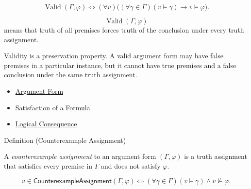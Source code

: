 \begin{remark*}
\[
\operatorname{Valid}(\Gamma,\varphi)
\Longleftrightarrow
(\forall v)\bigl((\forall\gamma\in\Gamma)(v\models\gamma)
\to v\models\varphi\bigr).
\]
\end{remark*}

\begin{remark*}
\[
  \operatorname{Valid}(\Gamma,\varphi)
\] means that truth of all
premises forces truth of the conclusion under every truth assignment.
\end{remark*}

\begin{remark*}[Interpretation]
Validity is a preservation property. A valid argument form may have false
premises in a particular instance, but it cannot have true premises and a false
conclusion under the same truth assignment.
\end{remark*}

\begin{dependencies}
\begin{itemize}
  \item \hyperref[def:argument-form-propositional-logic]{Argument Form}
  \item \hyperref[def:satisfaction-propositional-formula]{Satisfaction of a Formula}
  \item \hyperref[def:logical-consequence-propositional-logic]{Logical Consequence}
\end{itemize}
\end{dependencies}

\begin{definitionbox}{Definition (Counterexample Assignment)}
\begin{definition}
\label{def:counterexample-assignment-propositional-logic}
A \emph{counterexample assignment} to an argument form \((\Gamma,\varphi)\) is a
truth assignment that satisfies every premise in \(\Gamma\) and does not satisfy
\(\varphi\).
\end{definition}
\end{definitionbox}

\begin{remark*}
\[
v\in\mathsf{CounterexampleAssignment}(\Gamma,\varphi)
\Longleftrightarrow
(\forall\gamma\in\Gamma)(v\models\gamma)\land v\not\models\varphi.
\]
\end{remark*}


